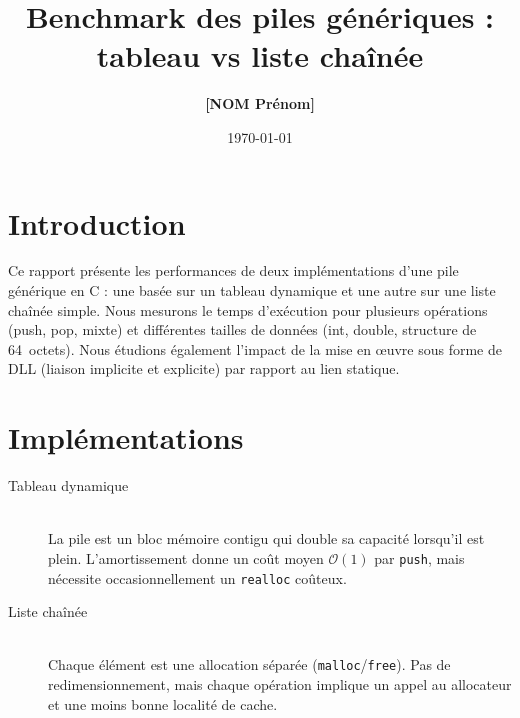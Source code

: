 \documentclass[12pt]{article}
\title{Benchmark des piles génériques : tableau vs liste chaînée}
\author{\textbf{[NOM Prénom]}}
\date{\today}
\begin{document}
\maketitle

\section{Introduction}
Ce rapport présente les performances de deux implémentations d'une pile générique en C :
une basée sur un tableau dynamique et une autre sur une liste chaînée simple.
Nous mesurons le temps d'exécution pour plusieurs opérations (push, pop, mixte) et
différentes tailles de données (int, double, structure de 64~octets).
Nous étudions également l'impact de la mise en œuvre sous forme de DLL (liaison
implicite et explicite) par rapport au lien statique.

\section{Implémentations}
\begin{description}
  \item[Tableau dynamique] \hfill\\
    La pile est un bloc mémoire contigu qui double sa capacité lorsqu'il est plein.
    L'amortissement donne un coût moyen \(\mathcal{O}(1)\) par \texttt{push}, mais
    nécessite occasionnellement un \texttt{realloc} coûteux.
  \item[Liste chaînée] \hfill\\
    Chaque élément est une allocation séparée (\texttt{malloc}/\texttt{free}).
    Pas de redimensionnement, mais chaque opération implique un appel au
    allocateur et une moins bonne localité de cache.
\end{description}
\end{document}
